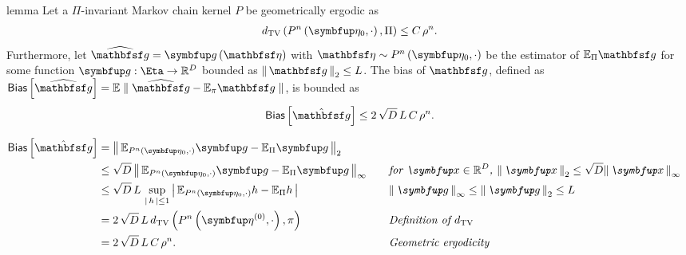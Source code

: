 \begin{theoremEnd}{lemma}\label{thm:mcmc_bias}
  Let a \(\Pi\)-invariant Markov chain kernel \(P\) be geometrically ergodic as
  \begin{align*}
    \DTV{P^{n}\left(\veta_0, \cdot\right)}{ \Pi } \leq C \, \rho^{n}.
  \end{align*}
  Furthermore, let \(\widehat{\rvvg} = \vg\left(\rvveta\right)\) with \(\rvveta \sim P^n\left(\veta_0, \cdot\right)\) be the estimator of \(\mathbb{E}_{\Pi}\rvvg\) for some function \(\vg : \Eta \rightarrow \mathbb{R}^{D}\) bounded as \( \norm{\rvvg}_{2} \leq L \).
  The bias of \(\rvvg\), defined as
  \(
    \mathsf{Bias}\left[ \widehat{\rvvg} \right] = \mathbb{E}\parallel \widehat{\rvvg} - \mathbb{E}_{\pi}\rvvg \parallel
  \),
  is bounded as
  \begin{alignat*}{2}
    \mathsf{Bias}\left[ \hat{\rvvg} \right]
    \leq
    2 \, \sqrt{D} \, L \, C \, \rho^{n}.
  \end{alignat*}
\end{theoremEnd}
\begin{proofEnd}
  \begin{alignat}{2}
    \mathsf{Bias}\left[ \hat{\rvvg} \right]
    &=
    \norm{
      \mathbb{E}_{P^n\left(\veta_0, \cdot\right)}\vg
      -
      \mathbb{E}_{\Pi}\vg
    }_2
    \nonumber
    \\
    &\leq
    \sqrt{D}\,\norm{
      \mathbb{E}_{P^n\left(\veta_0, \cdot\right)}\vg
      -
      \mathbb{E}_{\Pi}\vg
    }_{\infty}
    &&\quad\text{\textit{for  \(\vx \in \mathbb{R}^D\), \(\norm{\vx}_2 \leq \sqrt{D}\norm{\vx}_{\infty}\)}}
    \nonumber
    \\
    &\leq
    \sqrt{D}\,L\,\sup_{\abs{h} \leq 1}
    \abs{
      \mathbb{E}_{P^n\left(\veta_0, \cdot\right)}h
      -
      \mathbb{E}_{\Pi}h
    }
    &&\quad\text{\textit{\(\norm{\vg}_{\infty} \leq \norm{\vg}_2 \leq L\)}}
    \nonumber
    \\
    &=
    2 \,  \sqrt{D} \, L \,
    \DTV{P^{n}\left(\veta^{(0)}, \cdot\right)}{\pi}
    &&\quad\text{\textit{Definition of \(d_{\mathrm{TV}}\)}}
    \nonumber
    \\
    &=
    2 \, \sqrt{D} \, L \, C \, \rho^{n}.
    &&\quad\text{\textit{Geometric ergodicity}}
    \nonumber
  \end{alignat}
\end{proofEnd}



